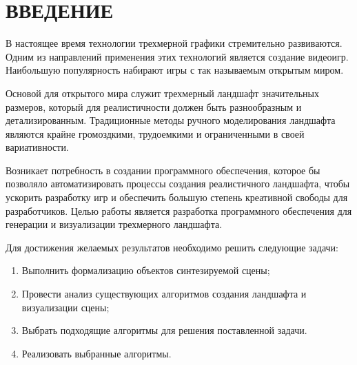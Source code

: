 \chapter*{ВВЕДЕНИЕ}

В настоящее время технологии трехмерной графики стремительно развиваются. Одним из направлений применения этих технологий является создание видеоигр. Наибольшую популярность набирают игры с так называемым открытым миром.

Основой для открытого мира служит трехмерный ландшафт значительных размеров, который для реалистичности должен быть разнообразным и детализированным. Традиционные методы ручного моделирования ландшафта являются крайне громоздкими, трудоемкими и ограниченными в своей вариативности. 

Возникает потребность в создании программного обеспечения, которое бы позволяло автоматизировать процессы создания реалистичного ландшафта, чтобы ускорить разработку игр и обеспечить большую степень креативной свободы для разработчиков.
Целью работы является разработка программного обеспечения для генерации и визуализации трехмерного ландшафта.

Для достижения желаемых результатов необходимо решить следующие задачи: 

\begin{enumerate}[label={\arabic*)}]
	\item Выполнить формализацию объектов синтезируемой сцены;
	\item Провести анализ существующих алгоритмов создания ландшафта и визуализации сцены;
	\item Выбрать подходящие алгоритмы для решения поставленной задачи.
	\item Реализовать выбранные алгоритмы.
\end{enumerate}

